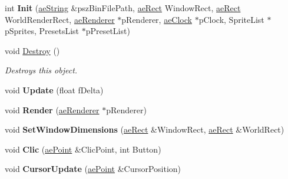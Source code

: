 \begin{DoxyCompactItemize}
\item 
int {\bfseries Init} (\hyperlink{namespaceae_core_ad6f85aacc0d1fdd85e458e2413e60010}{ae\+String} \&psz\+Bin\+File\+Path, \hyperlink{structae_core_1_1ae_rect}{ae\+Rect} Window\+Rect, \hyperlink{structae_core_1_1ae_rect}{ae\+Rect} World\+Render\+Rect, \hyperlink{classae_core_1_1ae_renderer}{ae\+Renderer} $\ast$p\+Renderer, \hyperlink{classae_core_1_1ae_clock}{ae\+Clock} $\ast$p\+Clock, Sprite\+List $\ast$p\+Sprites, Presets\+List $\ast$p\+Preset\+List)\hypertarget{classae_world_a0451a9905334a324deb1722d57dcc584}{}\label{classae_world_a0451a9905334a324deb1722d57dcc584}

\item 
void \hyperlink{classae_world_af3718f8cc66f64c7238c3b3d83987ae2}{Destroy} ()\hypertarget{classae_world_af3718f8cc66f64c7238c3b3d83987ae2}{}\label{classae_world_af3718f8cc66f64c7238c3b3d83987ae2}

\begin{DoxyCompactList}\small\item\em Destroys this object. \end{DoxyCompactList}\item 
void {\bfseries Update} (float f\+Delta)\hypertarget{classae_world_ae3c82e84e1e7246617bf11c387f11dc8}{}\label{classae_world_ae3c82e84e1e7246617bf11c387f11dc8}

\item 
void {\bfseries Render} (\hyperlink{classae_core_1_1ae_renderer}{ae\+Renderer} $\ast$p\+Renderer)\hypertarget{classae_world_a81ce74e0952df1c351dc65a8cc97be53}{}\label{classae_world_a81ce74e0952df1c351dc65a8cc97be53}

\item 
void {\bfseries Set\+Window\+Dimensions} (\hyperlink{structae_core_1_1ae_rect}{ae\+Rect} \&Window\+Rect, \hyperlink{structae_core_1_1ae_rect}{ae\+Rect} \&World\+Rect)\hypertarget{classae_world_a1a1b9f1dbb2375d10cda59e08be64db7}{}\label{classae_world_a1a1b9f1dbb2375d10cda59e08be64db7}

\item 
void {\bfseries Clic} (\hyperlink{structae_core_1_1ae_point}{ae\+Point} \&Clic\+Point, int Button)\hypertarget{classae_world_a0e0f8395684f11ee8d2271e32fd7f98e}{}\label{classae_world_a0e0f8395684f11ee8d2271e32fd7f98e}

\item 
void {\bfseries Cursor\+Update} (\hyperlink{structae_core_1_1ae_point}{ae\+Point} \&Cursor\+Position)\hypertarget{classae_world_abf8481b5949dea89bf90e7e65912c5ee}{}\label{classae_world_abf8481b5949dea89bf90e7e65912c5ee}


\end{DoxyCompactItemize}
